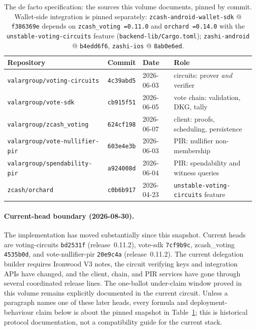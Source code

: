 \documentclass[11pt,a4paper]{article}
\theoremstyle{definition}
\begin{document}
\begin{table}[htbp]
\centering
\small
\begin{tabular}{@{}llll@{}}
\toprule
Repository & Commit & Date & Role \\
\midrule
\texttt{valargroup/voting-circuits} & \texttt{4c39abd5} & 2026-06-03 &
  circuits: prover \emph{and} verifier \\
\texttt{valargroup/vote-sdk} & \texttt{cb915f51} & 2026-06-05 &
  vote chain: validation, DKG, tally \\
\texttt{valargroup/zcash\_voting} & \texttt{624cf198} & 2026-06-07 &
  client: proofs, scheduling, persistence \\
\texttt{valargroup/vote-nullifier-pir} & \texttt{603e4e3b} & 2026-06-03 &
  PIR: nullifier non-membership \\
\texttt{valargroup/spendability-pir} & \texttt{a924008d} & 2026-06-04 &
  PIR: spendability and witness queries \\
\texttt{zcash/orchard} & \texttt{c0b6b917} & 2026-04-23 &
  \texttt{unstable-voting-circuits} feature \\
\bottomrule
\end{tabular}
\caption{The de facto specification: the sources this volume documents,
pinned by commit. Wallet-side integration is pinned separately:
\texttt{zcash-android-wallet-sdk} @ \texttt{f386369e} depends on
\texttt{zcash\_voting~=0.11.0} and \texttt{orchard~=0.14.0} with the
\texttt{unstable-voting-circuits} feature
(\texttt{backend-lib/Cargo.toml}); \texttt{zashi-android} @
\texttt{b4edd6f6}, \texttt{zashi-ios} @ \texttt{8ab0e6ed}.}
\label{tab:vote-sources}
\end{table}

\paragraph{Current-head boundary (2026-08-30).} The implementation has moved
substantially since this snapshot. Current heads are
\textsf{voting-circuits} \texttt{bd2531f} (release~0.11.2),
\textsf{vote-sdk} \texttt{7cf9b9c}, \textsf{zcash\_voting}
\texttt{4535b0d}, and \textsf{vote-nullifier-pir} \texttt{20e9c4a}
(release~0.11.2). The current delegation builder requires Ironwood V3 notes,
the circuit verifying keys and integration APIs have changed, and the client,
chain, and PIR services have gone through several coordinated release lines.
The one-ballot under-claim window proved in this volume remains explicitly
documented in the current circuit. Unless a paragraph names one of these later
heads, every formula and deployment-behaviour claim below is about the pinned
snapshot in Table~\ref{tab:vote-sources}; this is historical protocol
documentation, not a compatibility guide for the current stack.
\end{document}
